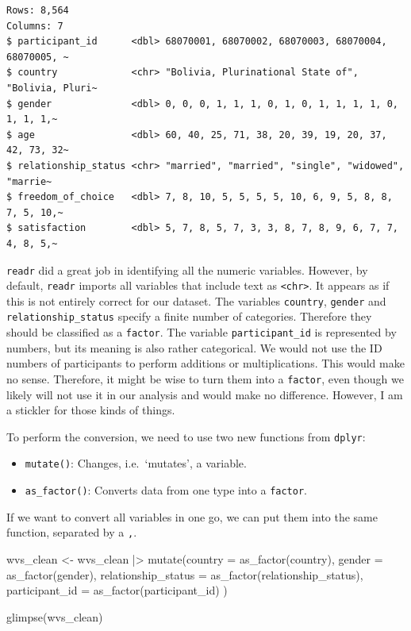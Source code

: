 \documentclass[
  letterpaper,
]{krantz}
\makeatletter
\newenvironment{Shaded}{\begin{snugshade}}{\end{snugshade}}
\newcommand{\AttributeTok}[1]{\textcolor[rgb]{0.40,0.45,0.13}{#1}}
\newcommand{\FunctionTok}[1]{\textcolor[rgb]{0.28,0.35,0.67}{#1}}
\newcommand{\NormalTok}[1]{\textcolor[rgb]{0.00,0.23,0.31}{#1}}
\newcommand{\OtherTok}[1]{\textcolor[rgb]{0.00,0.23,0.31}{#1}}
\newcommand{\SpecialCharTok}[1]{\textcolor[rgb]{0.37,0.37,0.37}{#1}}
\newenvironment{kframe}{%
\medskip{}
\setlength{\fboxsep}{.8em}
 \def\at@end@of@kframe{}%
 \ifinner\ifhmode%
  \def\at@end@of@kframe{\end{minipage}}%
  \begin{minipage}{\columnwidth}%
 \fi\fi%
 \def\FrameCommand##1{\hskip\@totalleftmargin \hskip-\fboxsep
 \colorbox{shadecolor}{##1}\hskip-\fboxsep
     \hskip-\linewidth \hskip-\@totalleftmargin \hskip\columnwidth}%
 \MakeFramed {\advance\hsize-\width
   \@totalleftmargin\z@ \linewidth\hsize
   \@setminipage}}%
 {\par\unskip\endMakeFramed%
 \at@end@of@kframe}
\renewenvironment{Shaded}{\begin{kframe}}{\end{kframe}}
\makeatother
\begin{document}
\begin{verbatim}
Rows: 8,564
Columns: 7
$ participant_id      <dbl> 68070001, 68070002, 68070003, 68070004, 68070005, ~
$ country             <chr> "Bolivia, Plurinational State of", "Bolivia, Pluri~
$ gender              <dbl> 0, 0, 0, 1, 1, 1, 0, 1, 0, 1, 1, 1, 1, 0, 1, 1, 1,~
$ age                 <dbl> 60, 40, 25, 71, 38, 20, 39, 19, 20, 37, 42, 73, 32~
$ relationship_status <chr> "married", "married", "single", "widowed", "marrie~
$ freedom_of_choice   <dbl> 7, 8, 10, 5, 5, 5, 5, 10, 6, 9, 5, 8, 8, 7, 5, 10,~
$ satisfaction        <dbl> 5, 7, 8, 5, 7, 3, 3, 8, 7, 8, 9, 6, 7, 7, 4, 8, 5,~
\end{verbatim}

\texttt{readr} did a great job in identifying all the numeric variables.
However, by default, \texttt{readr} imports all variables that include
text as \texttt{\textless{}chr\textgreater{}}. It appears as if this is
not entirely correct for our dataset. The variables \texttt{country},
\texttt{gender} and \texttt{relationship\_status} specify a finite
number of categories. Therefore they should be classified as a
\texttt{factor}. The variable \texttt{participant\_id} is represented by
numbers, but its meaning is also rather categorical. We would not use
the ID numbers of participants to perform additions or multiplications.
This would make no sense. Therefore, it might be wise to turn them into
a \texttt{factor}, even though we likely will not use it in our analysis
and would make no difference. However, I am a stickler for those kinds
of things.

To perform the conversion, we need to use two new functions from
\texttt{dplyr}:

\begin{itemize}
\item
  \texttt{mutate()}: Changes, i.e.~`mutates', a variable.
\item
  \texttt{as\_factor()}: Converts data from one type into a
  \texttt{factor}.
\end{itemize}

If we want to convert all variables in one go, we can put them into the
same function, separated by a \texttt{,}.

\begin{Shaded}
\begin{Highlighting}[]
\NormalTok{wvs\_clean }\OtherTok{\textless{}{-}}
\NormalTok{  wvs\_clean }\SpecialCharTok{|\textgreater{}}
  \FunctionTok{mutate}\NormalTok{(}\AttributeTok{country =} \FunctionTok{as\_factor}\NormalTok{(country),}
         \AttributeTok{gender =} \FunctionTok{as\_factor}\NormalTok{(gender),}
         \AttributeTok{relationship\_status =} \FunctionTok{as\_factor}\NormalTok{(relationship\_status),}
         \AttributeTok{participant\_id =} \FunctionTok{as\_factor}\NormalTok{(participant\_id)}
\NormalTok{         )}

\FunctionTok{glimpse}\NormalTok{(wvs\_clean)}
\end{Highlighting}
\end{Shaded}
\end{document}
